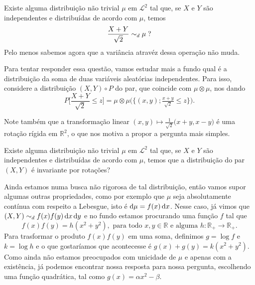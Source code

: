\begin{question}
  \label{q:ponto_fixo_soma}
  Existe alguma distribuição não trivial $\mu$ em $\mathcal{L}^2$ tal que, se $X$ e $Y$ são independentes e distribuídas de acordo com $\mu$, temos
  \begin{equation}
    \frac{X + Y}{\sqrt{2}} \sim_d \mu \; ?
  \end{equation}
  Pelo menos sabemos agora que a variância atravéz dessa operação não muda.
\end{question}

Para tentar responder essa questão, vamos estudar mais a fundo qual é a distribuição da soma de duas variáveis aleatórias independentes.
Para isso, considere a distribuição $(X,Y) \circ P$ do par, que coincide com $\mu \otimes \mu$, nos dando
\begin{equation}
  P\Big[ \frac{X + Y}{\sqrt{2}} \leq z \Big] = \mu \otimes \mu \big( \big\{(x, y); \tfrac{x + y}{\sqrt{2}} \leq z \big\} \big).
\end{equation}

Note também que a transformação linear $(x,y) \mapsto \tfrac{1}{\sqrt{2}}\big(x + y, x - y\big)$ é uma rotação rígida em $\mathbb{R}^2$, o que nos motiva a propor a pergunta mais simples.

\begin{question}
  Existe alguma distribuição não trivial $\mu$ em $\mathcal{L}^2$ tal que, se $X$ e $Y$ são independentes e distribuídas de acordo com $\mu$, temos que a distribuição do par $(X,Y)$ é invariante por rotações?
\end{question}

Ainda estamos numa busca não rigorosa de tal distribuição, então vamos supor algumas outras propriedades, como por exemplo que $\mu$ seja absolutamente contínua com respeito a Lebesgue, isto é $\mathop{}\!\mathrm{d} \mu = f(x) \mathop{}\!\mathrm{d} x$.
Nesse caso, já vimos que $(X, Y) \sim_d f(x) f(y) \mathop{}\!\mathrm{d} x \mathop{}\!\mathrm{d} y$ e no fundo estamos procurando uma função $f$ tal que
\begin{equation}
  f(x) f(y) = h(x^2 + y^2), \text{ para todo $x, y \in \mathbb{R}$ e alguma $h: \mathbb{R}_+ \to \mathbb{R}_+$.}
\end{equation}
Para trasformar o produto $f(x) f(y)$ em uma soma, definimos $g = \log f$ e $k = \log h$ e o que gostaríamos que acontecesse é $g(x) + g(y) = k(x^2 + y^2)$.
Como ainda não estamos preocupados com unicidade de $\mu$ e apenas com a existência, já podemos encontrar nossa resposta para nossa pergunta, escolhendo uma função quadrática, tal como $g(x) = \alpha x^2 - \beta$.


